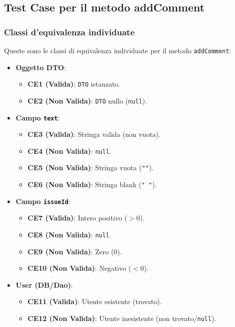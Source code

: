 \subsection{Test Case per il metodo addComment}
\subsubsection{Classi d'equivalenza individuate}
Queste sono le classi di equivalenza individuate per il metodo \texttt{addComment}:
\begin{itemize}
    \item \textbf{Oggetto DTO}:
    \begin{itemize}
        \item \textbf{CE1 (Valida)}: \texttt{DTO} istanzato.
        \item \textbf{CE2 (Non Valida)}: \texttt{DTO} nullo (\texttt{null}).
    \end{itemize}
    \item \textbf{Campo \texttt{text}}:
    \begin{itemize}
        \item \textbf{CE3 (Valida)}: Stringa valida (non vuota).
        \item \textbf{CE4 (Non Valida)}: \texttt{null}.
        \item \textbf{CE5 (Non Valida)}: Stringa vuota (\texttt{""}).
        \item \textbf{CE6 (Non Valida)}: Stringa blank (\texttt{" "}).
    \end{itemize}
    \item \textbf{Campo \texttt{issueId}}:
    \begin{itemize}
        \item \textbf{CE7 (Valida)}: Intero positivo ($> 0$).
        \item \textbf{CE8 (Non Valida)}: \texttt{null}.
        \item \textbf{CE9 (Non Valida)}: Zero ($0$).
        \item \textbf{CE10 (Non Valida)}: Negativo ($< 0$).
    \end{itemize}
    \item \textbf{User (DB/Dao)}:
    \begin{itemize}
        \item \textbf{CE11 (Valida)}: Utente esistente (trovato).
        \item \textbf{CE12 (Non Valida)}: Utente inesistente (non trovato/\texttt{null}).
    \end{itemize}
\end{itemize}

